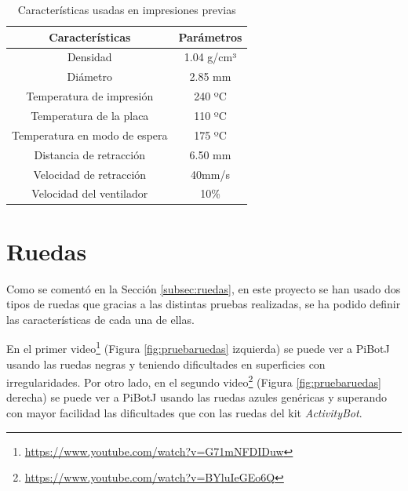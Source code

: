 \begin{table}[H]
	\begin{center}
		\begin{tabular}{|c|c|}
			\hline
			Características & Parámetros\\
			\hline
			 Densidad & 1.04 g/cm³\\
			\hline
			Diámetro & 2.85 mm\\
			\hline
			Temperatura de impresión & 240 ºC\\
			\hline
			Temperatura de la placa & 110 ºC\\
			\hline
			Temperatura en modo de espera & 175 ºC\\
			\hline
			Distancia de retracción & 6.50 mm\\
			\hline
			Velocidad de retracción & 40mm/s\\
			\hline
			Velocidad del ventilador & 10\%\\
			\hline
		\end{tabular}
		\caption{Características usadas en impresiones previas}
		\label{cuadro:cimpresion2}
	\end{center}
\end{table}

\section{Ruedas}
\label{sec:expruedas}
Como se comentó en la Sección \ref{subsec:ruedas}, en este proyecto se han usado dos tipos de ruedas que gracias a las distintas pruebas realizadas, se ha podido definir las características de cada una de ellas. 

En el primer video\footnote{\url{https://www.youtube.com/watch?v=G71mNFDIDuw}} (Figura \ref{fig:pruebaruedas} izquierda) se puede ver a PiBotJ usando las ruedas negras y teniendo dificultades en superficies con irregularidades. Por otro lado, en el segundo video\footnote{\url{https://www.youtube.com/watch?v=BYluIeGEo6Q}} (Figura \ref{fig:pruebaruedas} derecha) se puede ver a PiBotJ usando las ruedas azules genéricas y superando con mayor facilidad las dificultades que con las ruedas del kit \textit{ActivityBot}.


